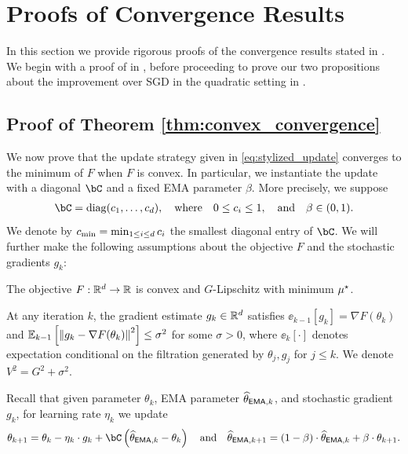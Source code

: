 \section{Proofs of Convergence Results}\label{app:convex_proofs}

In this section we provide rigorous proofs of the convergence results stated in .  We begin with a proof of  in , before proceeding to prove our two propositions about the improvement over SGD in the quadratic setting in .

\subsection{Proof of Theorem \ref{thm:convex_convergence}}\label{app:convex_convergence}

We now prove that the update strategy given in \eqref{eq:stylized_update} converges to the minimum of $F$ when $F$ is convex.  In particular, we instantiate the update with a diagonal $\bC$ and a fixed EMA parameter $\beta$.  More precisely, we suppose
\begin{align}\label{eq:convex_update_params}
    \bC = \diag(c_1, \dots, c_d), \quad \text{where} \quad 0 \leq c_i \leq 1, \quad \text{and} \quad \beta \in (0, 1).
\end{align}
We denote by $\cmin = \min_{1 \leq i \leq d} c_i$ the smallest diagonal entry of $\bC$.
We will further make the following assumptions about the objective $F$ and the stochastic gradients $g_k$:
\begin{assumption}\label{ass:convexity}
    The objective $F: \rr^d \to \rr$ is convex and $G$-Lipschitz with minimum $\mustar$.
\end{assumption}
\begin{assumption}\label{ass:stochastic_gradients}
    At any iteration $k$, the gradient estimate $g_k \in \rr^d$ satisfies $\ee_{k-1}\left[ g_k \right] = \nabla F(\theta_k)$ and $\ee_{k-1}\left[ \norm{g_k - \nabla F(\theta_k)}^2 \right] \leq \sigma^2$ for some $\sigma > 0$, where $\ee_{k}\left[ \cdot \right]$ denotes expectation conditional on the filtration generated by $\theta_j, g_j$ for $j \leq k$.  We denote $V^2 = G^2 + \sigma^2$.
\end{assumption}
Recall that given parameter $\theta_k$, EMA parameter $\thetema[k]$, and stochastic gradient $g_k$, for learning rate $\eta_k$ we update
\begin{align}\label{eq:update}
    \theta_{k+1} = \theta_k - \eta_k \cdot g_k + \bC\left( \thetema[k] - \theta_k \right) \quad \text{and} \quad \thetema[k+1] = (1 - \beta) \cdot \thetema[k] + \beta \cdot \theta_{k+1}.
\end{align}

